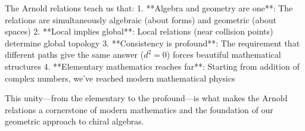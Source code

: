 The Arnold relations teach us that:
1. **Algebra and geometry are one**: The relations are simultaneously algebraic (about forms) and geometric (about spaces)
2. **Local implies global**: Local relations (near collision points) determine global topology
3. **Consistency is profound**: The requirement that different paths give the same answer ($d^2 = 0$) forces beautiful mathematical structures
4. **Elementary mathematics reaches far**: Starting from addition of complex numbers, we've reached modern mathematical physics

This unity—from the elementary to the profound—is what makes the Arnold relations a cornerstone of modern mathematics and the foundation of our geometric approach to chiral algebras.